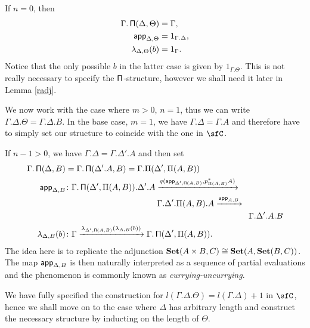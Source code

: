 \begin{construction}[Part 1]
  If $n=0$, then
  \begin{align*}
    \Gamma.\operatorname{\mathsf{\Pi}}(\Delta,\Theta) &=\Gamma, \\
    \operatorname{\mathsf{app}}_{\Delta,\Theta} &=1_{\Gamma.\Delta}, \\
    \lambda_{\Delta,\Theta}(b) &=1_\Gamma.
  \end{align*}
  Notice that the only possible $b$ in the latter case is given by
  $1_{\Gamma.\Theta}$. This is not really necessary to specify the
  $\operatorname{\mathsf{\Pi}}$-structure, however we shall need it later in Lemma \ref{radj}.

  We now work with the case where $m>0$, $n=1$, thus we can write
  $\Gamma.\Delta.\Theta=\Gamma.\Delta.B$. In the base case, $m=1$, we have
  $\Gamma.\Delta=\Gamma.A$ and therefore have to simply set our structure to
  coincide with the one in $\sfC$.

  If $n-1>0$, we have
  $\Gamma.\Delta=\Gamma.\Delta'.A$ and then set
  \begin{align*}
    \Gamma.\operatorname{\mathsf{\Pi}}(\Delta,B)
    &=\Gamma.\operatorname{\mathsf{\Pi}}(\Delta'.A,B)=\Gamma.\Pi(\Delta',\Pi(A,B)) \\
    \operatorname{\mathsf{app}}_{\Delta,B} 
    &\colon
    \Gamma.\operatorname{\mathsf{\Pi}}(\Delta',\Pi(A,B)).\Delta'.A
                    \xrightarrow{q(\operatorname{\mathsf{app}}_{\Delta',\operatorname{\mathsf{\Pi}}(A,B)},p^*_{\Pi(A,B)}A)} \\
    &\quad\quad\quad\quad\quad\quad\quad\quad\quad\quad\quad
    \Gamma.\Delta'.\Pi(A,B).A
    \xrightarrow{\operatorname{\mathsf{app}}_{A,B}} \\
    &\quad\quad\quad\quad\quad\quad\quad\quad\quad\quad\quad\quad\quad\quad\quad\quad\quad\quad\quad\quad\quad\quad
    \Gamma.\Delta'.A.B \\
    \lambda_{\Delta,B}(b)
    &\colon
    \Gamma
    \xrightarrow{\lambda_{\Delta',\operatorname{\mathsf{\Pi}}(A,B)}(\lambda_{A,B}(b))}
    \Gamma.\operatorname{\mathsf{\Pi}}(\Delta',\Pi(A,B)).
  \end{align*}
  The idea here is to replicate the adjunction $\operatorname{\mathbf{Set}}(A\times
  B,C)\cong\operatorname{\mathbf{Set}}(A,\operatorname{\mathbf{Set}}(B,C))$. The map $\operatorname{\mathsf{app}}_{\Delta,B}$ is then naturally
  interpreted as a sequence of partial evaluations and the phenomenon is
  commonly known as \emph{currying-uncurrying}.

\end{construction}

  We have fully specified the construction for
  $l(\Gamma.\Delta.\Theta)=l(\Gamma.\Delta)+1$ in $\sfC$, hence we shall move on
  to the case where $\Delta$ has arbitrary length and construct the necessary
  structure by inducting on the length of $\Theta$.

